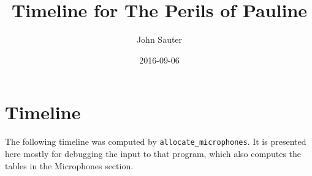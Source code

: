 \documentclass[letterpaper]{article}
\title{Timeline for The Perils of Pauline}
\author{John Sauter}
\date{2016-09-06}
\begin{document}
\maketitle
\newpage

\section {Timeline}
The following timeline was computed by {\tt allocate\_microphones}.
It is presented here mostly for debugging the input to that program,
which also computes the tables in the Microphones section.


\end{document}
